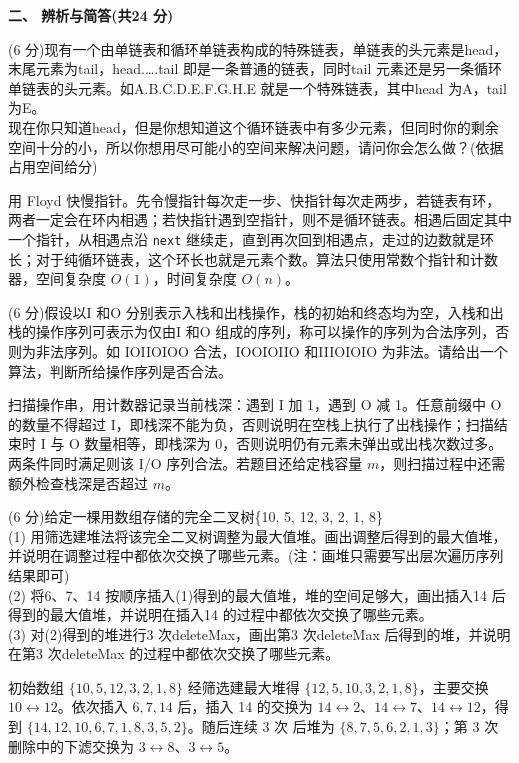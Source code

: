 \textbf{二、 辨析与简答(共24 分)}
\begin{question}
(6 分)现有一个由单链表和循环单链表构成的特殊链表，单链表的头元素是head，末尾元素为tail，head.….tail 即是一条普通的链表，同时tail 元素还是另一条循环单链表的头元素。如A.B.C.D.E.F.G.H.E 就是一个特殊链表，其中head 为A，tail 为E。\\
现在你只知道head，但是你想知道这个循环链表中有多少元素，但同时你的剩余空间十分的小，所以你想用尽可能小的空间来解决问题，请问你会怎么做？(依据占用空间给分)
\begin{solution}
用 Floyd 快慢指针。先令慢指针每次走一步、快指针每次走两步，若链表有环，两者一定会在环内相遇；若快指针遇到空指针，则不是循环链表。相遇后固定其中一个指针，从相遇点沿 \texttt{next} 继续走，直到再次回到相遇点，走过的边数就是环长；对于纯循环链表，这个环长也就是元素个数。算法只使用常数个指针和计数器，空间复杂度 $O(1)$，时间复杂度 $O(n)$。
\end{solution}
\end{question}

\begin{question}
(6 分)假设以I 和O 分别表示入栈和出栈操作，栈的初始和终态均为空，入栈和出栈的操作序列可表示为仅由I 和O 组成的序列，称可以操作的序列为合法序列，否则为非法序列。如 IOIIOIOO 合法，IOOIOIIO 和IIIOIOIO 为非法。请给出一个算法，判断所给操作序列是否合法。
\begin{solution}
扫描操作串，用计数器记录当前栈深：遇到 I 加 1，遇到 O 减 1。任意前缀中 O 的数量不得超过 I，即栈深不能为负，否则说明在空栈上执行了出栈操作；扫描结束时 I 与 O 数量相等，即栈深为 0，否则说明仍有元素未弹出或出栈次数过多。两条件同时满足则该 I/O 序列合法。若题目还给定栈容量 $m$，则扫描过程中还需额外检查栈深是否超过 $m$。
\end{solution}
\end{question}

\begin{question}
(6 分)给定一棵用数组存储的完全二叉树\{10, 5, 12, 3, 2, 1, 8\}\\
(1) 用筛选建堆法将该完全二叉树调整为最大值堆。画出调整后得到的最大值堆，并说明在调整过程中都依次交换了哪些元素。(注：画堆只需要写出层次遍历序列结果即可)\\
(2) 将6、7、14 按顺序插入(1)得到的最大值堆，堆的空间足够大，画出插入14 后得到的最大值堆，并说明在插入14 的过程中都依次交换了哪些元素。\\
(3) 对(2)得到的堆进行3 次deleteMax，画出第3 次deleteMax 后得到的堆，并说明在第3 次deleteMax 的过程中都依次交换了哪些元素。
\begin{solution}
初始数组 $\{10,5,12,3,2,1,8\}$ 经筛选建最大堆得 $\{12,5,10,3,2,1,8\}$，主要交换 $10\leftrightarrow12$。依次插入 $6,7,14$ 后，插入 14 的交换为 $14\leftrightarrow2$、$14\leftrightarrow7$、$14\leftrightarrow12$，得到 $\{14,12,10,6,7,1,8,3,5,2\}$。随后连续 3 次 \texttt{} 后堆为 $\{8,7,5,6,2,1,3\}$；第 3 次删除中的下滤交换为 $3\leftrightarrow8$、$3\leftrightarrow5$。
\end{solution}
\end{question}

